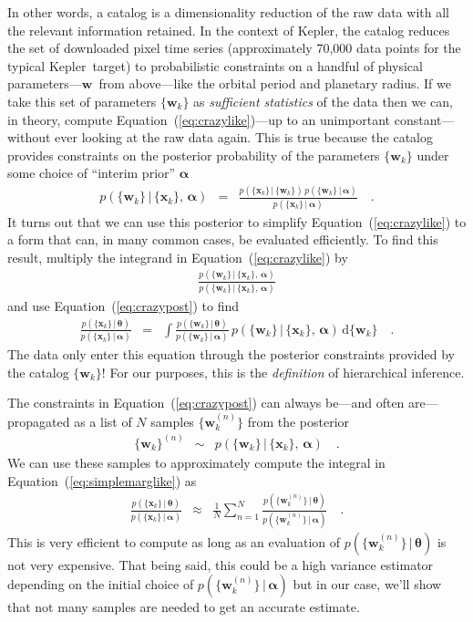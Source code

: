 \documentclass[12pt,preprint]{aastex}
\newcommand{\project}[1]{{\sffamily #1}}
\newcommand{\kepler}{\project{Kepler}}
\newcommand{\Eq}[1]{Equation~(\ref{eq:#1})}
\newcommand{\eq}[1]{\Eq{#1}}
\newcommand{\eqlabel}[1]{\label{eq:#1}}
\newcommand{\dd}{\ensuremath{\,\mathrm{d}}}
\newcommand{\bvec}[1]{\ensuremath{\boldsymbol{#1}}}
\newcommand{\ratepar}{{\ensuremath{\theta}}}
\newcommand{\ratepars}{{\ensuremath{\bvec{\ratepar}}}}
\newcommand{\data}{{\ensuremath{\bvec{x}}}}
\newcommand{\entry}{{\ensuremath{\bvec{w}}}}
\newcommand{\interim}{{\ensuremath{\bvec{\alpha}}}}
\begin{document}
In other words, a catalog is a dimensionality reduction of the raw data with
all the relevant information retained.
In the context of \kepler, the catalog reduces the set of downloaded pixel
time series (approximately 70,000 data points for the typical \kepler\ target)
to probabilistic constraints on a handful of physical parameters---\entry\
from above---like the orbital period and planetary radius.
If we take this set of parameters $\{\entry_k\}$ as \emph{sufficient
statistics} of the data then we can, in theory, compute \eq{crazylike}---up to
an unimportant constant---without ever looking at the raw data again.
This is true because the catalog provides constraints on the posterior
probability of the parameters $\{\entry_k\}$ under some choice of ``interim
prior'' \interim
\begin{eqnarray}\eqlabel{crazypost}
p(\{\entry_k\}\,|\,\{\data_k\},\,\interim) &=&
\frac{p(\{\data_k\}\,|\,\{\entry_k\})\,p(\{\entry_k\}\,|\,\interim)}
     {p(\{\data_k\}\,|\,\interim)} \quad.
\end{eqnarray}
It turns out that we can use this posterior to simplify \eq{crazylike} to a
form that can, in many common cases, be evaluated efficiently.
To find this result, multiply the integrand in \eq{crazylike} by
\begin{eqnarray}
\frac{p(\{\entry_k\}\,|\,\{\data_k\},\,\interim)}
     {p(\{\entry_k\}\,|\,\{\data_k\},\,\interim)}
\end{eqnarray}
and use \eq{crazypost} to find
\begin{eqnarray}\eqlabel{simplemarglike}
\frac{p(\{\data_k\}\,|\,\ratepars)}{p(\{\data_k\}\,|\,\interim)} &=&
    \int
    \frac{p(\{\entry_k\}\,|\,\ratepars)}{p(\{\entry_k\}\,|\,\interim)}\,
    p(\{\entry_k\}\,|\,\{\data_k\},\,\interim)
    \dd\{\entry_k\} \quad.
\end{eqnarray}
The data only enter this equation through the posterior constraints provided
by the catalog $\{\entry_k\}$!
For our purposes, this is the \emph{definition} of hierarchical inference.

The constraints in \eq{crazypost} can always be---and often are---propagated
as a list of $N$ samples $\{\entry_k^{(n)}\}$ from the posterior
\begin{eqnarray}
\{\entry_k\}^{(n)} &\sim& p(\{\entry_k\}\,|\,\{\data_k\},\,\interim) \quad.
\end{eqnarray}
We can use these samples to approximately compute the integral in
\eq{simplemarglike} as
\begin{eqnarray}\eqlabel{importance}
\frac{p(\{\data_k\}\,|\,\ratepars)}{p(\{\data_k\}\,|\,\interim)} &\approx&
    \frac{1}{N} \sum_{n=1}^N
    \frac{p(\{\entry_k^{(n)}\}\,|\,\ratepars)}
         {p(\{\entry_k^{(n)}\}\,|\,\interim)} \quad.
\end{eqnarray}
This is very efficient to compute as long as an evaluation of
$p(\{\entry_k^{(n)}\}\,|\,\ratepars)$ is not very expensive.
That being said, this could be a high variance estimator depending on the
initial choice of $p(\{\entry_k^{(n)}\}\,|\,\interim)$ but in our case, we'll
show that not many samples are needed to get an accurate estimate.
\end{document}
